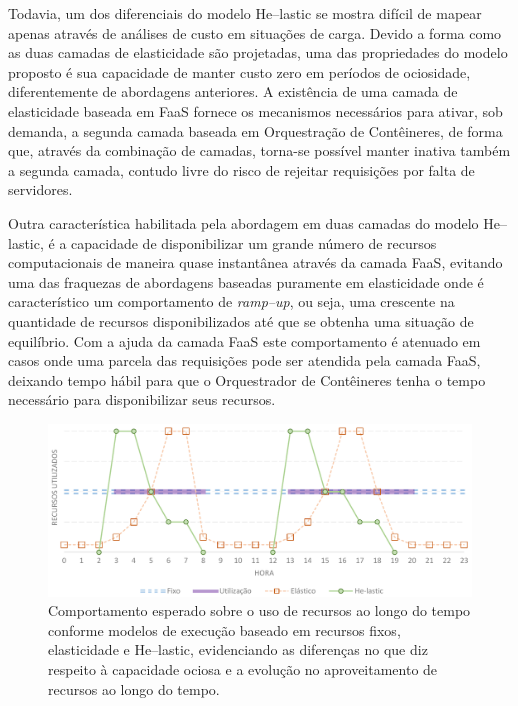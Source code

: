 \documentclass[english,brazilian]{UNISINOSmonografia} %
\newcommand\defaultFigureWidth{0.9}
\begin{document}
Todavia, um dos diferenciais do modelo \textsf{He}--lastic se mostra difícil de mapear apenas através de análises de custo em situações de carga.
Devido a forma como as duas camadas de elasticidade são projetadas, uma das propriedades do modelo proposto é sua capacidade de manter custo zero em períodos de ociosidade, diferentemente de abordagens anteriores.
A existência de uma camada de elasticidade baseada em FaaS fornece os mecanismos necessários para ativar, sob demanda, a segunda camada baseada em Orquestração de Contêineres, de forma que, através da combinação de camadas, torna-se possível manter inativa também a segunda camada, contudo livre do risco de rejeitar requisições por falta de servidores.


Outra característica habilitada pela abordagem em duas camadas do modelo \textsf{He}--lastic, é a capacidade de disponibilizar um grande número de recursos computacionais de maneira quase instantânea através da camada FaaS, evitando uma das fraquezas de abordagens baseadas puramente em elasticidade onde é característico um comportamento de \textit{ramp--up}, ou seja, uma crescente na quantidade de recursos disponibilizados até que se obtenha uma situação de equilíbrio.
Com a ajuda da camada FaaS este comportamento é atenuado em casos onde uma parcela das requisições pode ser atendida pela camada FaaS, deixando tempo hábil para que o Orquestrador de Contêineres tenha o tempo necessário para disponibilizar seus recursos.


\begin{figure}[tb]
	\centering%
	\begin{minipage}{\defaultFigureWidth\textwidth}
		\caption{Comportamento esperado sobre o uso de recursos ao longo do tempo conforme modelos de execução baseado em recursos fixos, elasticidade e \textsf{He}--lastic, evidenciando as diferenças no que diz respeito à capacidade ociosa e a evolução no aproveitamento de recursos ao longo do tempo.}
		\label{fig:modelo-custben-alternativas}
		\includegraphics[width=\textwidth]{modelo-custben-alternativas}
	\end{minipage}
\end{figure}
\end{document}
